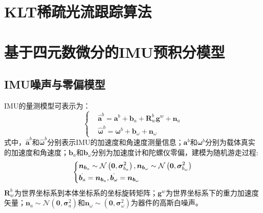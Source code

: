 \section{KLT稀疏光流跟踪算法}
\label{append.a}
\section{基于四元数微分的IMU预积分模型}
\label{append.b}
\subsection{IMU噪声与零偏模型}
IMU的量测模型可表示为：
\begin{equation}
\left\{
\begin{aligned}
&\hat{\bm{a}}^b=\bm{a}^b+\bm{b}_a+\bm{R}_w^b\bm{g}^w+\bm{n}_a\\
&\hat{\bm{\omega}}^b=\bm{\omega}^b+\bm{b}_\omega+\bm{n}_\omega
\end{aligned}
\right.
\end{equation}
式中，$\hat{\bm{a}}^b$和$\hat{\bm{\omega}}^b$分别表示IMU的加速度和角速度测量信息；$\bm{a}^b$和$\bm{\omega}^b$分别为载体真实的加速度和角速度；$\bm{b}_a$和$\bm{b}_\omega$分别为加速度计和陀螺仪零偏，建模为随机游走过程:
\begin{equation}
\centering
\left\{
\begin{aligned}
&\bm{n}_{\bm{b}_a}\sim\mathcal{N}\left(\bm{0},\bm{\sigma}_{b_a}^2\right),\bm{n}_{\bm{b}_\omega}\sim\mathcal{N}\left(\bm{0},\bm{\sigma}_{b_\omega}^2\right)\\
&\dot{\bm{b}_a}=\bm{n}_{\bm{b}_a},\dot{\bm{b}_\omega}=\bm{n}_{\bm{b}_\omega}
\end{aligned}
\right.
\end{equation}
$\bm{R}_w^b$为世界坐标系到本体坐标系的坐标旋转矩阵；$\bm{g}^w$为世界坐标系下的重力加速度矢量；$\bm{n}_a\sim\mathcal{N}\left(\bm{0},\bm{\sigma}_a^2\right)$和$\bm{n}_\omega\sim\left(\bm{0},\bm{\sigma}_\omega^2\right)$为器件的高斯白噪声。
